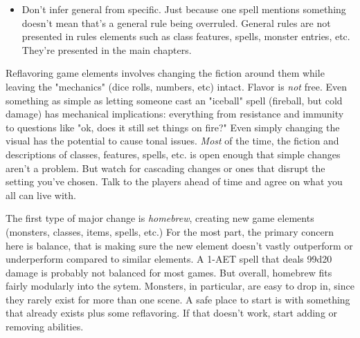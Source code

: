 \documentclass[10pt,twoside,openany,bg=none]{dndbook}
\begin{document}
\begin{itemize}
    \item Don't infer general from specific. Just because one spell mentions something doesn't mean that's a general rule being overruled. General rules are not presented in rules elements such as class features, spells, monster entries, etc. They're presented in the main chapters.
\end{itemize}

Reflavoring game elements involves changing the fiction around them while leaving the "mechanics" (dice rolls, numbers, etc) intact. Flavor is \textit{not} free. Even something as simple as letting someone cast an "iceball" spell (fireball, but cold damage) has mechanical implications: everything from resistance and immunity to questions like "ok, does it still set things on fire?" Even simply changing the visual has the potential to cause tonal issues. \textit{Most} of the time, the fiction and descriptions of classes, features, spells, etc. is open enough that simple changes aren't a problem. But watch for cascading changes or ones that disrupt the setting you've chosen. Talk to the players ahead of time and agree on what you all can live with.

The first type of major change is \textit{homebrew}, creating new game elements (monsters, classes, items, spells, etc.) For the most part, the primary concern here is balance, that is making sure the new element doesn't vastly outperform or underperform compared to similar elements. A 1-AET spell that deals 99d20 damage is probably not balanced for most games. But overall, homebrew fits fairly modularly into the sytem. Monsters, in particular, are easy to drop in, since they rarely exist for more than one scene. A safe place to start is with something that already exists plus some reflavoring. If that doesn't work, start adding or removing abilities.
\end{document}
